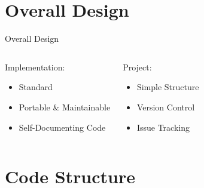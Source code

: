 






\section{Overall Design}

\begin{frame}{Overall Design}{\ecs{}}\nocite{cpp}
\begin{columns}[T]
\column{12em}
\begin{block}{Implementation:}
\begin{itemize}
\item Standard \cpp{} \bigskip
\item Portable \& Maintainable \bigskip
\item Self-Documenting Code \bigskip
\end{itemize}
\end{block}
\column{9em}
\begin{block}{Project:}
\begin{itemize}
\item Simple Structure \bigskip
\item Version Control \bigskip
\item Issue Tracking \bigskip
\end{itemize}
\end{block}
\end{columns}
\end{frame}

\section{Code Structure}

